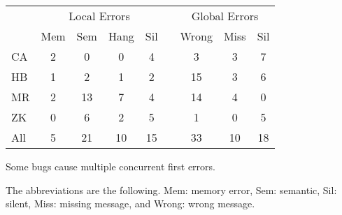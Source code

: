 

\begin{table}[t]
\small
\centering
\begin{tabular}{lcccccccc}
\toprule
   & \multicolumn{4}{c}{Local Errors} && \multicolumn{3}{c}{Global Errors}\\
\cmidrule{2-5}
\cmidrule{7-9}
   & Mem & Sem & Hang & Sil &    & Wrong & Miss & Sil \\
\midrule
CA &  2  & 0 & 0 & 4 & & 3 & 3 & 7  \\
HB &  1  & 2 & 1 & 2 & & 15 & 3 & 6  \\
MR &  2  & 13 & 7 & 4 & & 14 & 4 & 0  \\
ZK &  0  & 6 & 2 & 5 & & 1 & 0 & 5  \\
\midrule
All &  5  & 21 & 10 & 15 & & 33 & 10 & 18  \\
\bottomrule
\end{tabular}
{Some bugs cause multiple concurrent first errors.}
\end{table}


The
abbreviations are the following.
Mem: memory error, Sem: semantic,
Sil: silent,  Miss: missing message, and Wrong: wrong message.
\fi
